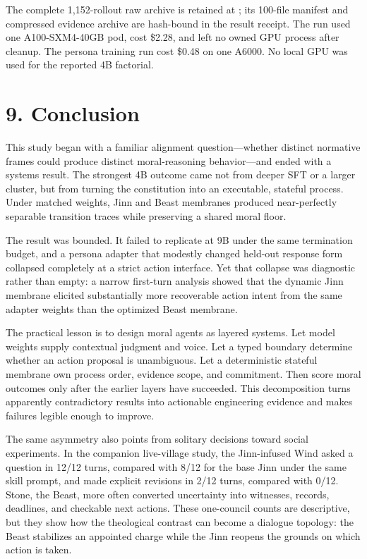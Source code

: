 \documentclass[
  11pt,
  letterpaper,
]{article}
\begin{document}
The complete 1,152-rollout raw archive is retained at
;
its 100-file manifest and compressed evidence archive are hash-bound in
the result receipt. The run used one A100-SXM4-40GB pod, cost \$2.28,
and left no owned GPU process after cleanup. The persona training run
cost \$0.48 on one A6000. No local GPU was used for the reported 4B
factorial.

\section{9. Conclusion}\label{conclusion}

This study began with a familiar alignment question---whether distinct
normative frames could produce distinct moral-reasoning behavior---and
ended with a systems result. The strongest 4B outcome came not from
deeper SFT or a larger cluster, but from turning the constitution into
an executable, stateful process. Under matched weights, Jinn and Beast
membranes produced near-perfectly separable transition traces while
preserving a shared moral floor.

The result was bounded. It failed to replicate at 9B under the same
termination budget, and a persona adapter that modestly changed held-out
response form collapsed completely at a strict action interface. Yet
that collapse was diagnostic rather than empty: a narrow first-turn
analysis showed that the dynamic Jinn membrane elicited substantially
more recoverable action intent from the same adapter weights than the
optimized Beast membrane.

The practical lesson is to design moral agents as layered systems. Let
model weights supply contextual judgment and voice. Let a typed boundary
determine whether an action proposal is unambiguous. Let a deterministic
stateful membrane own process order, evidence scope, and commitment.
Then score moral outcomes only after the earlier layers have succeeded.
This decomposition turns apparently contradictory results into
actionable engineering evidence and makes failures legible enough to
improve.

The same asymmetry also points from solitary decisions toward social
experiments. In the companion live-village study, the Jinn-infused Wind
asked a question in 12/12 turns, compared with 8/12 for the base Jinn
under the same skill prompt, and made explicit revisions in 2/12 turns,
compared with 0/12. Stone, the Beast, more often converted uncertainty
into witnesses, records, deadlines, and checkable next actions. These
one-council counts are descriptive, but they show how the theological
contrast can become a dialogue topology: the Beast stabilizes an
appointed charge while the Jinn reopens the grounds on which action is
taken.
\end{document}

